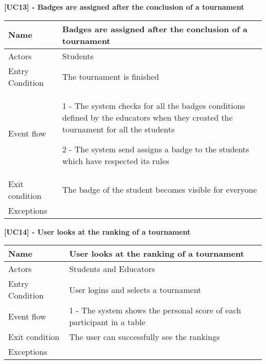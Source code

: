     \begin{table}[htb]
    \textbf{[UC13] - Badges are assigned after the conclusion of a tournament}
    
      \centering
      \begin{tabular}{|p{3cm}|p{14cm}|}
        \hline
         Name & Badges are assigned after the conclusion of a tournament \\
        \hline
        Actors & Students \\
        \hline
        Entry Condition & The tournament is finished \\
        \hline
        Event flow &  1 - The system checks for all the badges conditions defined by the educators when they created the tournament for all the students 
        
        2 - The system send assigns a badge to the students which have respected its rules
        \\
        \hline
        Exit condition & The badge of the student becomes visible for everyone \\
        \hline
        Exceptions &
        \\
        \hline
      \end{tabular}
      
    \end{table}

    \begin{table}[htb]
    \textbf{[UC14] - User looks at the ranking of a tournament}
    
      \centering
      \begin{tabular}{|p{3cm}|p{14cm}|}
        \hline
         Name & User looks at the ranking of a tournament \\
        \hline
        Actors & Students and Educators  \\
        \hline
        Entry Condition & User logins and selects a tournament \\
        \hline
        Event flow &  1 - The system shows the personal score of each participant in a table
        \\
        \hline
        Exit condition & The user can successfully see the rankings \\
        \hline
        Exceptions &
        \\
        \hline
      \end{tabular}
      
    \end{table}

